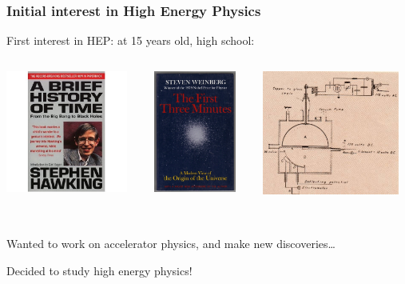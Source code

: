 \documentclass{beamer}
\begin{document}
\begin{frame}
\frametitle{Initial interest in High Energy Physics}
First interest in HEP: at {\color{blue}15 years old}, high school:
\begin{columns}
\begin{column}[T]{3.5cm}
\begin{center}
\includegraphics[width=4cm]{briefhist}
\end{center}
\end{column}
\begin{column}[T]{3cm}
\begin{center}
\includegraphics[width=2.7cm]{firstthree}
\end{center}
\end{column}
\begin{column}[T]{5cm}
\begin{center}
\includegraphics[width=4.5cm]{firstcyclo}
\end{center}
\end{column}
\end{columns}
~\\
Wanted to work on accelerator physics, and make new discoveries\ldots\\
\begin{center} 
\alert{Decided to study high energy physics!}
\end{center}
\end{frame}
\end{document}
